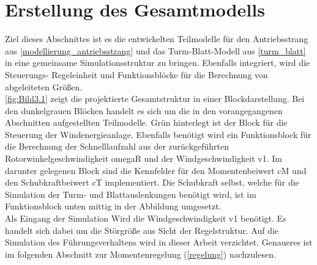 \section{Erstellung des Gesamtmodells} \label{gesamtmodell}

Ziel dieses Abschnittes ist es die entwickelten Teilmodelle für den Antriebsstrang aus \autoref{modellierung_antriebsstrang} und das Turm-Blatt-Modell aus \autoref{turm_blatt} in eine gemeinsame Simulationsstruktur zu bringen. Ebenfalls integriert, wird die Steuerungs- \bzw Regeleinheit und Funktionsblöcke für die Berechnung von abgeleiteten Größen.\\
\autoref{fig:Bild3.1} zeigt die projektierte Gesamtstruktur in einer Blockdarstellung. Bei den dunkelgrauen Blöcken handelt es sich um die in den vorangegangenen Abschnitten aufgestellten Teilmodelle. Grün hinterlegt ist der Block für die Steuerung der Windenergieanlage. Ebenfalls benötigt wird ein Funktionsblock für die Berechnung der Schnelllaufzahl aus der zurückgeführten Rotorwinkelgeschwindigkeit \acs{omegaR} und der Windgeschwindigkeit \acs{v1}. Im darunter gelegenen Block sind die Kennfelder für den Momentenbeiwert \acs{cM} und den Schubkraftbeiwert \acs{cT} implementiert. Die Schubkraft selbst, welche für die Simulation der Turm- und Blattauslenkungen benötigt wird, ist im Funktionsblock unten mittig in der Abbildung umgesetzt.\\
Als Eingang der Simulation Wird die Windgeschwindigkeit \acs{v1} benötigt. Es handelt sich dabei um die Störgröße aus Sicht der Regelstruktur. Auf die Simulation des Führungsverhaltens wird in dieser Arbeit verzichtet. Genaueres ist im folgenden Abschnitt zur Momentenregelung (\autoref{regelung}) nachzulesen.\\

